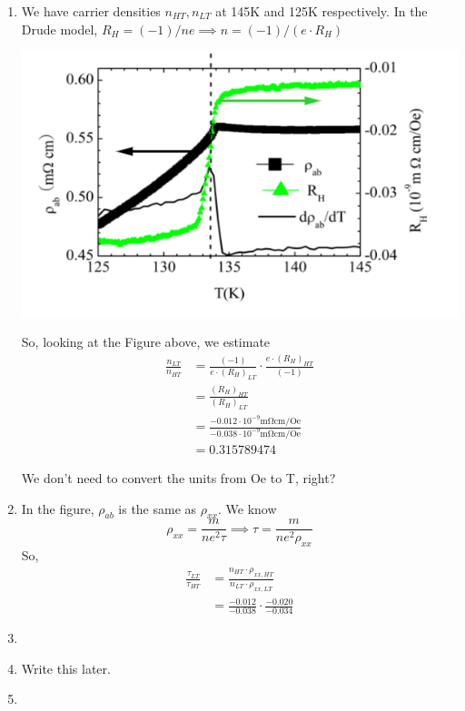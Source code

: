 \documentclass[11pt]{article}
\begin{document}
\begin{enumerate}
  \item We have carrier densities $n_{HT}, n_{LT}$ at 145K and 125K respectively. In the Drude model, $R_H = (-1)/ne \implies n = (-1)/(e \cdot R_H)$
  \begin{center}
    \includegraphics*[scale=0.45]{q1_figure.png}
  \end{center}
  So, looking at the Figure above, we estimate 
  \begin{align*}
    \frac{n_{LT}}{n_{HT}} &= \frac{(-1)}{e \cdot (R_H)_{LT}} \cdot \frac{e \cdot (R_H)_{HT}}{(-1)} \\
    &= \frac{(R_H)_{HT}}{(R_H)_{LT}} \\
    &= \frac{-0.012  \cdot 10^{-9} \mathrm{m \Omega cm/Oe} }{-0.038 \cdot 10^{-9} \mathrm{m \Omega cm/Oe}} \\
    &= 0.315789474
  \end{align*}
  \begin{note}
    {We don't need to convert the units from Oe to T, right?}
  \end{note}

  \item In the figure, $\rho_{ab}$ is the same as $\rho_{xx}$. We know $$ \rho_{xx} = \frac{m}{ne^2 \tau} \implies \tau = \frac{m}{ne^2 \rho_{xx}}  $$ So,
  \begin{align*}
    \frac{\tau_{LT}}{\tau_{HT}} &= \frac{n_{HT} \cdot \rho_{xx, HT}}{n_{LT} \cdot \rho_{xx, LT}} \\
    &= \frac{-0.012}{-0.038} \cdot \frac{-0.020}{-0.034}
  \end{align*}


  \item 
  
  \item Write this later.
  
  \item 
\end{enumerate}
\end{document}
